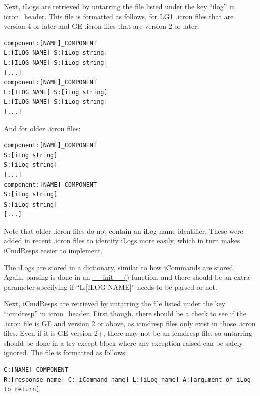 \documentclass[12pt,letterpaper]{article}
\begin{document}
Next, iLogs are retrieved by untarring the file listed under the key ``ilog'' in icron\_header. This file is formatted as follows, for LG1 .icron files that are version 4 or later and GE .icron files that are version 2 or later:

\selectfont

\begin{lstlisting}
component:[NAME]_COMPONENT
L:[ILOG NAME] S:[iLog string]
L:[ILOG NAME] S:[iLog string]
[...]
component:[NAME]_COMPONENT
L:[ILOG NAME] S:[iLog string]
L:[ILOG NAME] S:[iLog string]
[...]
\end{lstlisting}

\selectfont

And for older .icron files:

\selectfont

\begin{lstlisting}
component:[NAME]_COMPONENT
S:[iLog string]
S:[iLog string]
[...]
component:[NAME]_COMPONENT
S:[iLog string]
S:[iLog string]
[...]
\end{lstlisting}

\selectfont

Note that older .icron files do not contain an iLog name identifier. These were added in recent .icron files to identify iLogs more easily, which in turn makes iCmdResps easier to implement.

The iLogs are stored in a dictionary, similar to how iCommands are stored. Again, parsing is done in an \hyperref[4.6.1.4.0]{\_\_init\_\_()} function, and there should be an extra parameter specifying if ``L:[ILOG NAME]'' needs to be parsed or not.

Next, iCmdResps are retrieved by untarring the file listed under the key ``icmdresp'' in icron\_header. First though, there should be a check to see if the .icron file is GE and version 2 or above, as icmdresp files only exist in those .icron files. Even if it is GE version 2+, there may not be an icmdresp file, so untarring should be done in a try-except block where any exception raised can be safely ignored. The file is formatted as follows:

\selectfont

\begin{lstlisting}
C:[NAME]_COMPONENT
R:[response name] C:[iCommand name] L:[iLog name] A:[argument of iLog to return]
\end{lstlisting}

\selectfont
\end{document}
